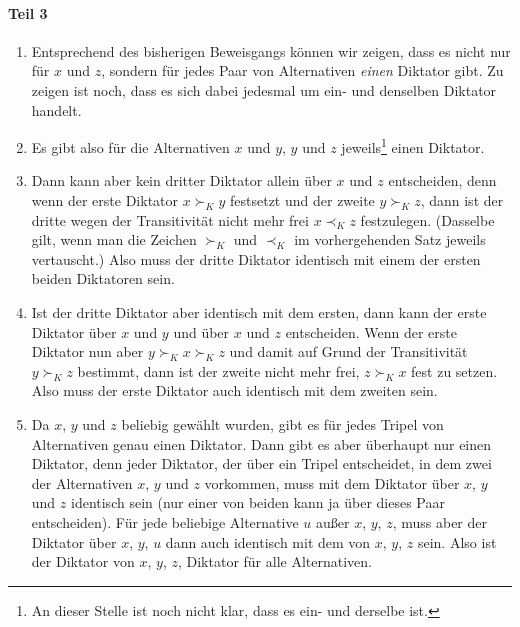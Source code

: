 \paragraph{Teil 3}

\begin{enumerate}
  \item Entsprechend des bisherigen Beweisgangs können wir zeigen, dass es
  nicht nur für $x$ und $z$, sondern für jedes Paar von Alternativen {\em einen}
  Diktator gibt. Zu zeigen ist noch, dass es sich dabei jedesmal um ein- und
  denselben Diktator handelt.
  
  \item Es gibt also für die Alternativen $x$ und $y$,
  $y$ und $z$ jeweils\footnote{An dieser Stelle ist noch nicht klar, dass es
  ein- und derselbe ist.} einen Diktator.

  \item Dann kann aber kein dritter Diktator allein über $x$ und $z$ entscheiden,
  denn wenn der erste Diktator $x \succ_K y$ festsetzt und der zweite $y \succ_K
  z$, dann ist der dritte wegen der Transitivität nicht mehr frei $x \prec_K z$
  festzulegen. (Dasselbe gilt, wenn man die Zeichen $\succ_K$ und $\prec_K$ im
  vorhergehenden Satz jeweils vertauscht.) Also muss der dritte Diktator
  identisch mit einem der ersten beiden Diktatoren sein.
 
  \item Ist der dritte Diktator aber identisch mit dem ersten, dann kann der
  erste Diktator über $x$ und $y$ und über $x$ und $z$ entscheiden. Wenn der
  erste Diktator nun aber $y \succ_K x \succ_K z$ und damit auf Grund der
  Transitivität $y \succ_K z$ bestimmt, dann ist der zweite nicht mehr frei, $z
  \succ_K x$ fest zu setzen. Also muss der erste Diktator auch identisch mit dem
  zweiten sein.
  
  \item Da $x$, $y$ und $z$ beliebig gewählt wurden, gibt es für jedes Tripel von
  Alternativen genau einen Diktator. Dann gibt es aber überhaupt nur einen
  Diktator, denn jeder Diktator, der über ein Tripel entscheidet, in dem zwei der
  Alternativen $x$, $y$ und $z$ vorkommen, muss mit dem Diktator über $x$, $y$
  und $z$ identisch sein (nur einer von beiden kann ja über dieses Paar
  entscheiden). Für jede beliebige Alternative $u$ außer $x$, $y$, $z$, muss aber
  der Diktator über $x$, $y$, $u$ dann auch identisch mit dem von $x$, $y$, $z$
  sein. Also ist der Diktator von $x$, $y$, $z$, Diktator für alle Alternativen.
\end{enumerate}

